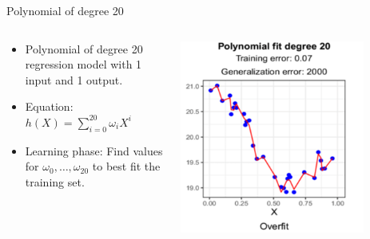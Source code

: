 \begin{frame}{Polynomial of degree 20}
  \begin{columns}
    \begin{column}{0.5\textwidth}
  \begin{itemize}
    \item Polynomial of degree 20 regression model with 1 input and 1 output.
    \item Equation: $h(X) = \sum_{i=0}^{20} \omega_i X^i$
    \item Learning phase: Find values for $\omega_0, \dots, \omega_{20}$ to best fit the training set.
  \end{itemize}
\end{column}
\begin{column}{0.5\textwidth}
  \includegraphics[width=0.8\textwidth]{images/pm20.png}
\end{column}
\end{columns}
\end{frame}

